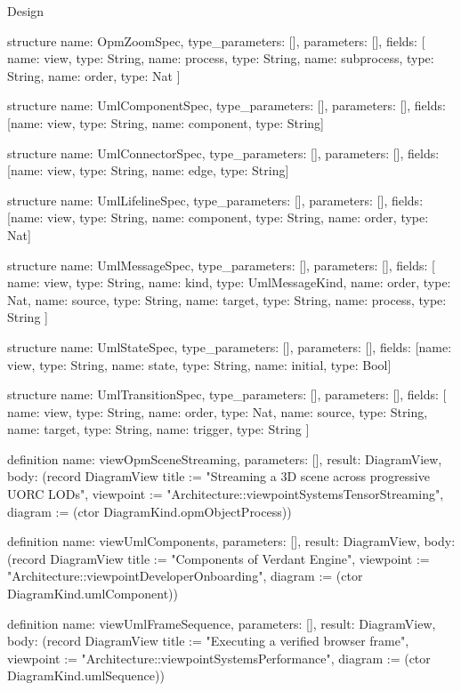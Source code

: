 \begin{lexlean}{Design}
\begin{semanticmodule}
structure{
  name: OpmZoomSpec,
  type_parameters: [],
  parameters: [],
  fields: [
    {name: view, type: String},
    {name: process, type: String},
    {name: subprocess, type: String},
    {name: order, type: Nat}
  ]
}

structure{
  name: UmlComponentSpec,
  type_parameters: [],
  parameters: [],
  fields: [{name: view, type: String}, {name: component, type: String}]
}

structure{
  name: UmlConnectorSpec,
  type_parameters: [],
  parameters: [],
  fields: [{name: view, type: String}, {name: edge, type: String}]
}

structure{
  name: UmlLifelineSpec,
  type_parameters: [],
  parameters: [],
  fields: [{name: view, type: String}, {name: component, type: String}, {name: order, type: Nat}]
}

structure{
  name: UmlMessageSpec,
  type_parameters: [],
  parameters: [],
  fields: [
    {name: view, type: String},
    {name: kind, type: UmlMessageKind},
    {name: order, type: Nat},
    {name: source, type: String},
    {name: target, type: String},
    {name: process, type: String}
  ]
}

structure{
  name: UmlStateSpec,
  type_parameters: [],
  parameters: [],
  fields: [{name: view, type: String}, {name: state, type: String}, {name: initial, type: Bool}]
}

structure{
  name: UmlTransitionSpec,
  type_parameters: [],
  parameters: [],
  fields: [
    {name: view, type: String},
    {name: order, type: Nat},
    {name: source, type: String},
    {name: target, type: String},
    {name: trigger, type: String}
  ]
}

definition{
  name: viewOpmSceneStreaming,
  parameters: [],
  result: DiagramView,
  body: (record DiagramView {title := "Streaming a 3D scene across progressive UORC LODs", viewpoint := "Architecture::viewpointSystemsTensorStreaming", diagram := (ctor DiagramKind.opmObjectProcess)})
}

definition{
  name: viewUmlComponents,
  parameters: [],
  result: DiagramView,
  body: (record DiagramView {title := "Components of Verdant Engine", viewpoint := "Architecture::viewpointDeveloperOnboarding", diagram := (ctor DiagramKind.umlComponent)})
}

definition{
  name: viewUmlFrameSequence,
  parameters: [],
  result: DiagramView,
  body: (record DiagramView {title := "Executing a verified browser frame", viewpoint := "Architecture::viewpointSystemsPerformance", diagram := (ctor DiagramKind.umlSequence)})
}


\end{semanticmodule}
\end{lexlean}

